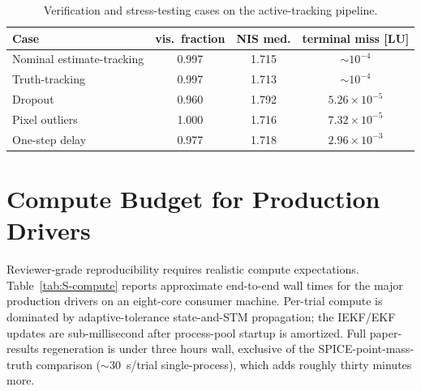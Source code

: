 \documentclass[10pt]{article}
\begin{document}
\begin{table}[h]
\centering
\caption{Verification and stress-testing cases on the active-tracking pipeline.}
\label{tab:S-vv}
\footnotesize
\begin{tabular}{@{}lccc@{}}
\toprule
Case & vis.\ fraction & NIS med. & terminal miss [LU] \\
\midrule
Nominal estimate-tracking & 0.997 & 1.715 & $\sim 10^{-4}$ \\
Truth-tracking            & 0.997 & 1.713 & $\sim 10^{-4}$ \\
Dropout                   & 0.960 & 1.792 & $5.26\times10^{-5}$ \\
Pixel outliers            & 1.000 & 1.716 & $7.32\times10^{-5}$ \\
One-step delay            & 0.977 & 1.718 & $2.96\times10^{-3}$ \\
\bottomrule
\end{tabular}
\end{table}

\section{Compute Budget for Production Drivers}
\label{sec:S-compute}
Reviewer-grade reproducibility requires realistic compute expectations.  Table~\ref{tab:S-compute} reports approximate end-to-end wall times for the major production drivers on an eight-core consumer machine.  Per-trial compute is dominated by adaptive-tolerance state-and-STM propagation; the IEKF/EKF updates are sub-millisecond after process-pool startup is amortized.  Full paper-results regeneration is under three hours wall, exclusive of the SPICE-point-mass-truth comparison ($\sim 30$~s/trial single-process), which adds roughly thirty minutes more.
\end{document}
